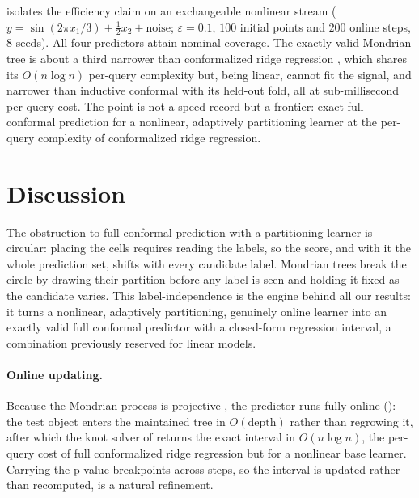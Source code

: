 \documentclass[twoside]{article}
\numberwithin{equation}{section}
\theoremstyle{plain}
\theoremstyle{definition}
\theoremstyle{remark}
\begin{document}
 isolates the efficiency claim on an exchangeable nonlinear stream
($y = \sin(2\pi x_1 / 3) + \tfrac12 x_2 + \text{noise}$; $\varepsilon = 0.1$, $100$ initial
points and $200$ online steps, $8$ seeds). All four predictors attain nominal coverage.
The exactly valid Mondrian tree is about a third narrower than conformalized ridge
regression \citep[Alg. 2.4]{alrw2}, which shares its $O(n\log n)$ per-query complexity but,
being linear, cannot fit the signal, and narrower than inductive conformal with its
held-out fold, all at sub-millisecond per-query cost. The point is not a speed record but a
frontier: exact full conformal prediction for a nonlinear, adaptively partitioning learner
at the per-query complexity of conformalized ridge regression.

\begin{table}[t]
  \centering
  \small
  
  \caption{Online coverage, mean interval width, and per-query time on an exchangeable
    nonlinear regression stream at significance level $\varepsilon = 0.1$ ($8$ seeds;
    standard errors in parentheses). All predictors are valid; the exactly valid Mondrian
    tree is markedly tighter than the linear conformal ridge and than split conformal.}
  \label{tab:nonlinear}
\end{table}

\section{Discussion}\label{sec:discussion}

The obstruction to full conformal prediction with a partitioning learner is circular:
placing the cells requires reading the labels, so the score, and with it the whole
prediction set, shifts with every candidate label. Mondrian trees break the circle by
drawing their partition before any label is seen and holding it fixed as the candidate
varies. This label-independence is the engine behind all our results: it turns a nonlinear,
adaptively partitioning, genuinely online learner into an exactly valid full conformal
predictor with a closed-form regression interval, a combination previously reserved for
linear models.

\paragraph{Online updating.}
Because the Mondrian process is projective \citep{roy2009mondrian,
lakshminarayanan2014mondrian}, the predictor runs fully online ():
the test object enters the maintained tree in $O(\mathrm{depth})$ rather than regrowing it,
after which the knot solver of  returns the exact interval in
$O(n \log n)$, the per-query cost of full conformalized ridge regression
\citep{nouretdinov2001rrcm, vovk2009online, alrw2} but for a nonlinear base learner.
Carrying the p-value breakpoints across steps, so the interval is updated rather than
recomputed, is a natural refinement.
\end{document}
